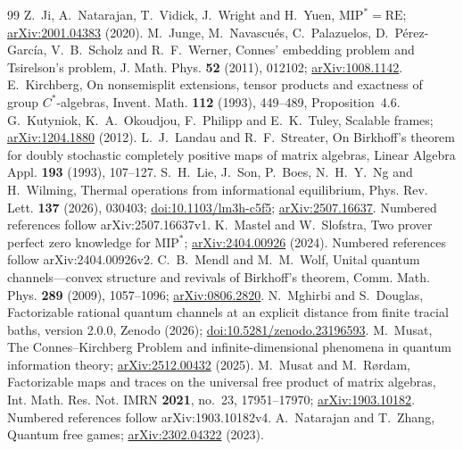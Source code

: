 \documentclass[11pt]{article}
\theoremstyle{definition}
\theoremstyle{remark}
\begin{document}
\begin{thebibliography}{99}
 Z.~Ji, A.~Natarajan, T.~Vidick, J.~Wright and H.~Yuen, $\mathrm{MIP}^*=\mathrm{RE}$; \href{https://arxiv.org/abs/2001.04383}{arXiv:2001.04383} (2020).
 M.~Junge, M.~Navascu\'es, C.~Palazuelos, D.~P\'erez-Garc\'ia, V.~B.~Scholz and R.~F.~Werner, Connes' embedding problem and Tsirelson's problem, J. Math. Phys. \textbf{52} (2011), 012102; \href{https://arxiv.org/abs/1008.1142}{arXiv:1008.1142}.
 E.~Kirchberg, On nonsemisplit extensions, tensor products and exactness of group $C^*$-algebras, Invent. Math. \textbf{112} (1993), 449--489, Proposition~4.6.
 G.~Kutyniok, K.~A.~Okoudjou, F.~Philipp and E.~K.~Tuley, Scalable frames; \href{https://arxiv.org/abs/1204.1880}{arXiv:1204.1880} (2012).
 L.~J.~Landau and R.~F.~Streater, On Birkhoff's theorem for doubly stochastic completely positive maps of matrix algebras, Linear Algebra Appl. \textbf{193} (1993), 107--127.
 S.~H.~Lie, J.~Son, P.~Boes, N.~H.~Y.~Ng and H.~Wilming, Thermal operations from informational equilibrium, Phys. Rev. Lett. \textbf{137} (2026), 030403; \href{https://doi.org/10.1103/lm3h-c5f5}{doi:10.1103/lm3h-c5f5}; \href{https://arxiv.org/abs/2507.16637}{arXiv:2507.16637}. Numbered references follow arXiv:2507.16637v1.
 K.~Mastel and W.~Slofstra, Two prover perfect zero knowledge for $\mathrm{MIP}^*$; \href{https://arxiv.org/abs/2404.00926}{arXiv:2404.00926} (2024). Numbered references follow arXiv:2404.00926v2.
 C.~B.~Mendl and M.~M.~Wolf, Unital quantum channels---convex structure and revivals of Birkhoff's theorem, Comm. Math. Phys. \textbf{289} (2009), 1057--1096; \href{https://arxiv.org/abs/0806.2820}{arXiv:0806.2820}.
 N.~Mghirbi and S.~Douglas, Factorizable rational quantum channels at an explicit distance from finite tracial baths, version 2.0.0, Zenodo (2026); \href{https://doi.org/10.5281/zenodo.23196593}{doi:10.5281/zenodo.23196593}.
 M.~Musat, The Connes--Kirchberg Problem and infinite-dimensional phenomena in quantum information theory; \href{https://arxiv.org/abs/2512.00432}{arXiv:2512.00432} (2025).
 M.~Musat and M.~R\o rdam, Factorizable maps and traces on the universal free product of matrix algebras, Int. Math. Res. Not. IMRN \textbf{2021}, no.~23, 17951--17970; \href{https://arxiv.org/abs/1903.10182}{arXiv:1903.10182}. Numbered references follow arXiv:1903.10182v4.
 A.~Natarajan and T.~Zhang, Quantum free games; \href{https://arxiv.org/abs/2302.04322}{arXiv:2302.04322} (2023).

\end{thebibliography}
\end{document}
